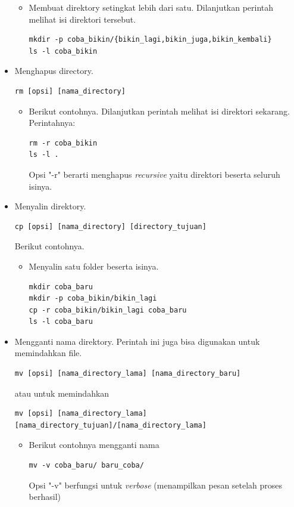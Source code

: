 \documentclass[12pt,]{article}
\begin{document}
\begin{itemize}
\begin{itemize}
			\item Membuat direktory setingkat lebih dari satu.
			Dilanjutkan perintah melihat isi direktori tersebut.
			\begin{verbatim}
mkdir -p coba_bikin/{bikin_lagi,bikin_juga,bikin_kembali}
ls -l coba_bikin
			\end{verbatim}
		\end{itemize}	
		
		\item Menghapus directory.
		\begin{verbatim}
rm [opsi] [nama_directory]
		\end{verbatim}
		\begin{itemize}
			\item Berikut contohnya.		
			Dilanjutkan perintah melihat isi direktori sekarang.
			Perintahnya:
			\begin{verbatim}
rm -r coba_bikin
ls -l .
			\end{verbatim}
			Opsi "-r" berarti menghapus \textit{recursive} yaitu direktori beserta seluruh isinya.
		\end{itemize}
	
		
		\item Menyalin direktory.
		\begin{verbatim}
cp [opsi] [nama_directory] [directory_tujuan]
		\end{verbatim}
		Berikut contohnya.
		\begin{itemize}
			\item Menyalin satu folder beserta isinya.
			\begin{verbatim}
mkdir coba_baru
mkdir -p coba_bikin/bikin_lagi
cp -r coba_bikin/bikin_lagi coba_baru
ls -l coba_baru
			\end{verbatim}
		\end{itemize}
					
		\item Mengganti nama direktory.
		Perintah ini juga bisa digunakan untuk memindahkan file.
		\begin{verbatim}
mv [opsi] [nama_directory_lama] [nama_directory_baru]
		\end{verbatim}
		atau untuk memindahkan
		\begin{verbatim}
mv [opsi] [nama_directory_lama] [nama_directory_tujuan]/[nama_directory_lama]
		\end{verbatim}
		\begin{itemize}
			\item Berikut contohnya mengganti nama
			\begin{verbatim}
mv -v coba_baru/ baru_coba/
			\end{verbatim}
			Opsi "-v" berfungsi untuk \textit{verbose} (menampilkan pesan setelah proses berhasil)
			

\end{itemize}
\end{itemize}
\end{document}
